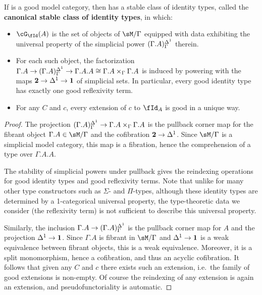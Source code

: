 \documentclass{amsart}
\let\Id\fId
\let\G\cG
\begin{document}
\begin{thm}\label{thm:stable-id}
  If \sM is a good model category, then \fibm has a stable class of identity types, called the \textbf{canonical stable class of identity types}, in which:
  \begin{itemize}
  \item $\G_\Id(A)$ is the set of objects of $\sM/\Gamma$ equipped with data exhibiting the universal property of the simplicial power $(\Gamma.A)^{\Delta^1}_\Gamma$ therein.
  \item For each such object, the factorization $\Gamma.A \to (\Gamma.A)^{\Delta^1}_\Gamma \to \Gamma.A.A \cong \Gamma.A \times_\Gamma \Gamma.A$ is induced by powering with the maps $\mathbf{2} \to {\Delta^1} \to \mathbf{1}$ of simplicial sets.
    In particular, every good identity type has exactly one good reflexivity term.
  \item For any $C$ and $c$, every extension of $c$ to $\Id_A$ is good in a unique way.
  \end{itemize}
\end{thm}
\begin{proof}
  The projection $(\Gamma.A)^{\Delta^1}_\Gamma \to \Gamma.A\times_\Gamma \Gamma.A$ is the pullback corner map for the fibrant object $\Gamma.A\in\sM/\Gamma$ and the cofibration $\mathbf{2}\to {\Delta^1}$.
  Since $\sM/\Gamma$ is a simplicial model category, this map is a fibration, hence the comprehension of a type over $\Gamma.A.A$.

  The stability of simplicial powers under pullback gives the reindexing operations for good identity types and good reflexivity terms.
  Note that unlike for many other type constructors such as $\Sigma$- and $\Pi$-types, although these identity types are determined by a 1-categorical universal property, the type-theoretic data we consider (the reflexivity term) is not sufficient to describe this universal property.

  Similarly, the inclusion $\Gamma.A\to (\Gamma.A)^{\Delta^1}_\Gamma$ is the pullback corner map for $A$ and the projection ${\Delta^1} \to \mathbf{1}$.
  Since $\Gamma.A$ is fibrant in $\sM/\Gamma$ and ${\Delta^1} \to \mathbf{1}$ is a weak equivalence between fibrant objects, this is a weak equivalence.
  Moreover, it is a split monomorphism, hence a cofibration, and thus an acyclic cofibration.
  It follows that given any $C$ and $c$ there exists such an extension, i.e.\ the family of good extensions is non-empty.
  Of course the reindexing of any extension is again an extension, and pseudofunctoriality is automatic.
\end{proof}
\end{document}
